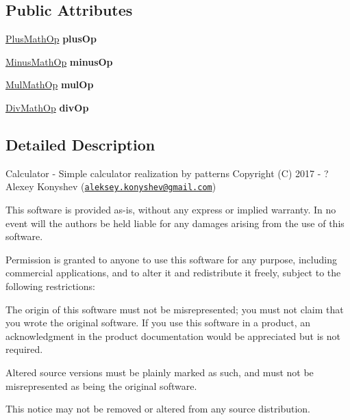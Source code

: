 \subsection*{Public Attributes}
\begin{DoxyCompactItemize}
\item 
\hypertarget{class_simple_calculator_a4d8d30bd990c0d203281bae710467047}{}\hyperlink{class_plus_math_op}{Plus\+Math\+Op} {\bfseries plus\+Op}\label{class_simple_calculator_a4d8d30bd990c0d203281bae710467047}

\item 
\hypertarget{class_simple_calculator_a5040eae51fb4c48586355e7eb32e1351}{}\hyperlink{class_minus_math_op}{Minus\+Math\+Op} {\bfseries minus\+Op}\label{class_simple_calculator_a5040eae51fb4c48586355e7eb32e1351}

\item 
\hypertarget{class_simple_calculator_a2c8040018960b251b1f9566d9ad620b8}{}\hyperlink{class_mul_math_op}{Mul\+Math\+Op} {\bfseries mul\+Op}\label{class_simple_calculator_a2c8040018960b251b1f9566d9ad620b8}

\item 
\hypertarget{class_simple_calculator_a2788f6712bb94eff9da6f7c59396e2f8}{}\hyperlink{class_div_math_op}{Div\+Math\+Op} {\bfseries div\+Op}\label{class_simple_calculator_a2788f6712bb94eff9da6f7c59396e2f8}

\end{DoxyCompactItemize}


\subsection{Detailed Description}
Calculator -\/ Simple calculator realization by patterns Copyright (C) 2017 -\/ ? Alexey Konyshev (\href{mailto:aleksey.konyshev@gmail.com}{\tt aleksey.\+konyshev@gmail.\+com})

This software is provided \textquotesingle{}as-\/is\textquotesingle{}, without any express or implied warranty. In no event will the authors be held liable for any damages arising from the use of this software.

Permission is granted to anyone to use this software for any purpose, including commercial applications, and to alter it and redistribute it freely, subject to the following restrictions\+:


\begin{DoxyEnumerate}
\item The origin of this software must not be misrepresented; you must not claim that you wrote the original software. If you use this software in a product, an acknowledgment in the product documentation would be appreciated but is not required.
\item Altered source versions must be plainly marked as such, and must not be misrepresented as being the original software.
\item This notice may not be removed or altered from any source distribution. 
\end{DoxyEnumerate}

